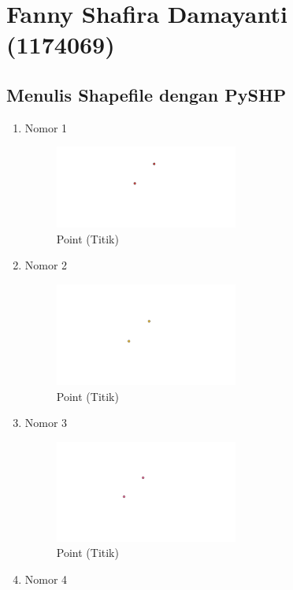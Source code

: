 \section{Fanny Shafira Damayanti (1174069)}
\subsection{Menulis Shapefile dengan PySHP}
\begin{enumerate}
	\item Nomor 1
	
	\begin{figure}[H]
		\includegraphics[width=6cm]{figures/Tugas2/1174069/No1.png}
		\centering
		\caption{Point (Titik)}
	\end{figure}
	\item Nomor 2
	
	\begin{figure}[H]
		\includegraphics[width=6cm]{figures/Tugas2/1174069/No2.png}
		\centering
		\caption{Point (Titik)}
	\end{figure}
	\item Nomor 3
	
	\begin{figure}[H]
		\includegraphics[width=6cm]{figures/Tugas2/1174069/No3.png}
		\centering
		\caption{Point (Titik)}
	\end{figure}
	\item Nomor 4
	
	\begin{figure}[H]

\end{figure}
\end{enumerate}
